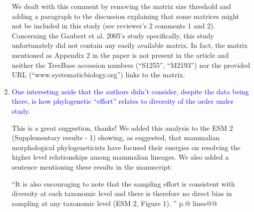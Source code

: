 \documentclass[12pt,letterpaper]{article}
\begin{document}
\begin{enumerate}
We dealt with this comment by removing the matrix size threshold and adding a paragraph to the discussion explaining that some matrices might not be included in this study (see reviewer's 2 comments 1 and 2).
Concerning the Gaubert et al. 2005's study specifically, this study unfortunately did not contain any easily available matrix.
In fact, the matrix mentioned as Appendix 2 in the paper is not present in the article and neither the TreeBase accession numbers (``S1255'', ``M2193'') nor the provided URL (``www.systematicbiology.org'') links to the matrix.

\item{\textcolor{blue}{One interesting aside that the authors didn't consider, despite the data being there, is how phylogenetic ``effort'' relates to diversity of the order under study.}}

This is a great suggestion, thanks!
We added this analysis to the ESM 2 (Supplementary results - 1) showing, as suggested, that mammalian morphological phylogeneticists have focused their energies on resolving the higher level relationships among mammalian lineages.
We also added a sentence mentioning these results in the manuscript:

``It is also encouraging to note that the sampling effort is consistent with diversity at each taxonomic level and there is therefore no direct bias in sampling at any taxonomic level (ESM 2, Figure 1).
'' p.@ lines@@


\end{enumerate}

\end{document}
